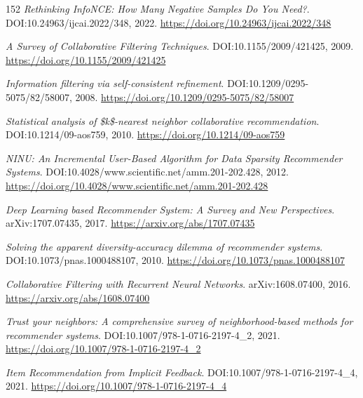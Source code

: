 \documentclass[11pt,a4paper]{article}
\begin{document}
\begin{thebibliography}{152}
\newblock \emph{Rethinking InfoNCE: How Many Negative Samples Do You Need?}.
\newblock DOI:10.24963/ijcai.2022/348, 2022.
\newblock \url{https://doi.org/10.24963/ijcai.2022/348}

\newblock \emph{A Survey of Collaborative Filtering Techniques}.
\newblock DOI:10.1155/2009/421425, 2009.
\newblock \url{https://doi.org/10.1155/2009/421425}

\newblock \emph{Information filtering via self-consistent refinement}.
\newblock DOI:10.1209/0295-5075/82/58007, 2008.
\newblock \url{https://doi.org/10.1209/0295-5075/82/58007}

\newblock \emph{Statistical analysis of \$k\$-nearest neighbor collaborative recommendation}.
\newblock DOI:10.1214/09-aos759, 2010.
\newblock \url{https://doi.org/10.1214/09-aos759}

\newblock \emph{NINU: An Incremental User-Based Algorithm for Data Sparsity Recommender Systems}.
\newblock DOI:10.4028/www.scientific.net/amm.201-202.428, 2012.
\newblock \url{https://doi.org/10.4028/www.scientific.net/amm.201-202.428}

\newblock \emph{Deep Learning based Recommender System: A Survey and New Perspectives}.
\newblock arXiv:1707.07435, 2017.
\newblock \url{https://arxiv.org/abs/1707.07435}

\newblock \emph{Solving the apparent diversity-accuracy dilemma of recommender systems}.
\newblock DOI:10.1073/pnas.1000488107, 2010.
\newblock \url{https://doi.org/10.1073/pnas.1000488107}

\newblock \emph{Collaborative Filtering with Recurrent Neural Networks}.
\newblock arXiv:1608.07400, 2016.
\newblock \url{https://arxiv.org/abs/1608.07400}

\newblock \emph{Trust your neighbors: A comprehensive survey of neighborhood-based methods for recommender systems}.
\newblock DOI:10.1007/978-1-0716-2197-4\_2, 2021.
\newblock \url{https://doi.org/10.1007/978-1-0716-2197-4_2}

\newblock \emph{Item Recommendation from Implicit Feedback}.
\newblock DOI:10.1007/978-1-0716-2197-4\_4, 2021.
\newblock \url{https://doi.org/10.1007/978-1-0716-2197-4_4}


\end{thebibliography}
\end{document}
